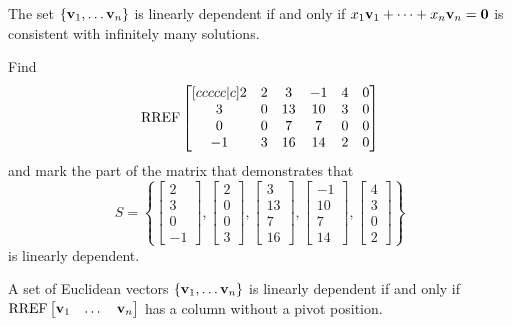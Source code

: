 \begin{applicationActivities}{1}{12}
\begin{fact}
  The set \(\{\mathbf v_1,\dots\mathbf v_n\}\) is linearly dependent if and only
  if \(x_1\mathbf v_1+\dots+x_n\mathbf v_n=\mathbf 0\) is consistent with
  infinitely many solutions.
\end{fact}

\begin{activity}{10}
  Find
  \[\operatorname{RREF}\begin{bmatrix}[ccccc|c]
  2&2&3&-1&4&0\\
  3&0&13&10&3&0\\
  0&0&7&7&0&0\\
  -1&3&16&14&2&0
  \end{bmatrix}
  \]
  and mark the part of the matrix that demonstrates that
  \[S=\left\{
  \begin{bmatrix}2\\3\\0\\-1\end{bmatrix},
  \begin{bmatrix}2\\0\\0\\3\end{bmatrix},
  \begin{bmatrix}3\\13\\7\\16\end{bmatrix},
  \begin{bmatrix}-1\\10\\7\\14\end{bmatrix},
  \begin{bmatrix}4\\3\\0\\2\end{bmatrix}
  \right\}
  \]
  is linearly dependent.
\end{activity}

\begin{fact}
  A set of Euclidean vectors
  \(\{\mathbf v_1,\dots\mathbf v_n\}\) is linearly dependent if and only
  if \(\operatorname{RREF}\begin{bmatrix}\mathbf v_1&\dots&\mathbf v_n\end{bmatrix}\)
  has a column without a pivot position.
\end{fact}


\end{applicationActivities}
